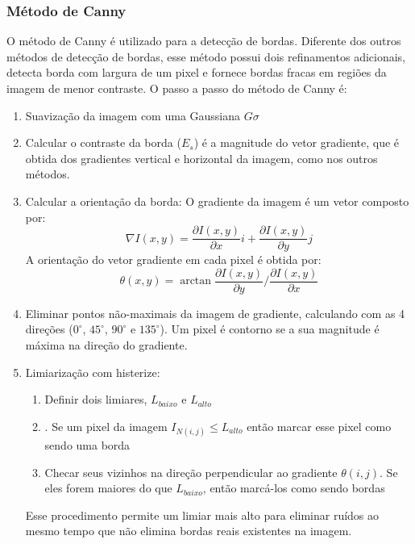 \documentclass{article}
\begin{document}
\subsubsection{Método de Canny}
O método de Canny é utilizado para a detecção de bordas. Diferente dos outros métodos de detecção de bordas, esse método possui dois refinamentos adicionais, detecta borda com largura de um pixel e fornece bordas fracas em regiões da imagem de menor contraste. 
O passo a passo do método de Canny é:
\begin{enumerate}
    \item Suavização da imagem com uma Gaussiana $G\sigma$
    \item Calcular o contraste da borda ($E_{s}$) é a magnitude do vetor gradiente, que é obtida dos gradientes vertical e horizontal da imagem, como nos outros métodos.
    \item Calcular a orientação da borda:
    O gradiente da imagem é um vetor composto por: $$\nabla I(x,y)=\frac{\partial I(x,y)}{\partial x}i + \frac{\partial I(x,y)}{\partial y}j $$
    \newline A orientação do vetor gradiente em cada pixel é obtida por:
    $$\theta(x,y) = \arctan\frac{\partial I(x,y)}{\partial y}/\frac{\partial I(x,y)}{\partial x}$$
    \item Eliminar pontos não-maximais da imagem de gradiente, calculando com as 4 direções ($0^\circ$, $45^\circ$, $90^\circ$ e $135^\circ$). Um pixel é contorno se a sua magnitude é máxima na direção do gradiente. 
    \item Limiarização com histerize: 
    \begin{enumerate}
        \item Definir dois limiares, $L_{baixo}$ e $L_{alto}$
        \item . Se um pixel da imagem $I_{N(i, j)} \le L_{alto}$ então marcar esse pixel como sendo uma borda
        \item Checar seus vizinhos na direção perpendicular ao gradiente $\theta(i, j)$. Se eles forem maiores do que $L_{baixo}$, então marcá-los como sendo bordas
    \end{enumerate} 
    Esse procedimento permite um limiar mais alto para eliminar ruídos ao mesmo tempo que não elimina bordas reais existentes na imagem.
\end{enumerate}
\end{document}
